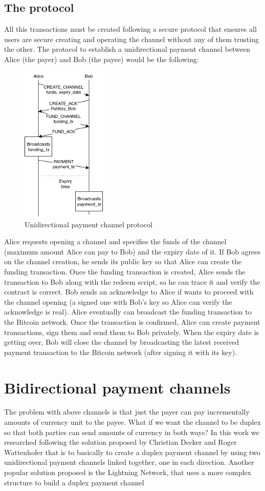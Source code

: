 \documentclass[12pt,journal,compsoc]{IEEEtran}
\begin{document}
\subsection{The protocol}
All this transactions must be created following a secure protocol that ensures all users are secure creating and operating the channel without any of them trusting the other. The protocol to establish a unidirectional payment channel between Alice (the payer) and Bob (the payee) would be the following:
\begin{figure}[h]
    \begin{center}
        \includegraphics[height=7.5cm]{unidir-pc}
        \caption{Unidirectional payment channel protocol}
    \end{center}
\end{figure}
Alice requests opening a channel and specifies the funds of the channel (maximum amount Alice can pay to Bob) and the expiry date of it. If Bob agrees on the channel creation, he sends its public key so that Alice can create the funding transaction. Once the funding transaction is created, Alice sends the transaction to Bob along with the redeem script, so he can trace it and verify the contract is correct. Bob sends an acknowledge to Alice if wants to proceed with the channel opening (a signed one with Bob's key so Alice can verify the acknowledge is real). Alice eventually can broadcast the funding transaction to the Bitcoin network. Once the transaction is confirmed, Alice can create payment transactions, sign them and send them to Bob privately. When the expiry date is getting over, Bob will close the channel by broadcasting the latest received payment transaction to the Bitcoin network (after signing it with its key).

\section{Bidirectional payment channels}
The problem with above channels is that just the payer can pay incrementally amounts of currency unit to the payee. What if we want the channel to be duplex so that both parties can send amounts of currency in both ways? In this work we researched following the solution proposed by Christian Decker and Roger Wattenhofer\cite{decker2015fast} that is to basically to create a duplex payment channel by using two unidirectional payment channels linked together, one in each direction. Another popular solution proposed is the Lightning Network, that uses a more complex structure to build a duplex payment channel\cite{poon2015bitcoin}
\end{document}
